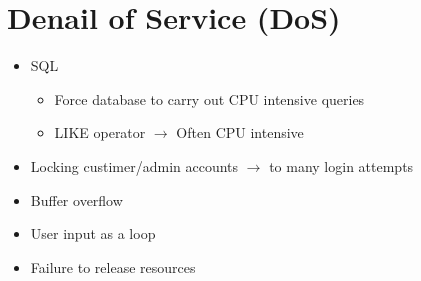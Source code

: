 \clearpage
\section{Denail of Service (DoS)}
	\begin{itemize}
		\item SQL 
			\begin{itemize}
				\item Force database to carry out CPU intensive queries
				\item LIKE operator $\rightarrow$ Often CPU intensive 
			\end{itemize}
		\item Locking custimer/admin accounts $\rightarrow$ to many login attempts
		\item Buffer overflow
		\item User input as a loop
		\item Failure to release resources
	\end{itemize}
